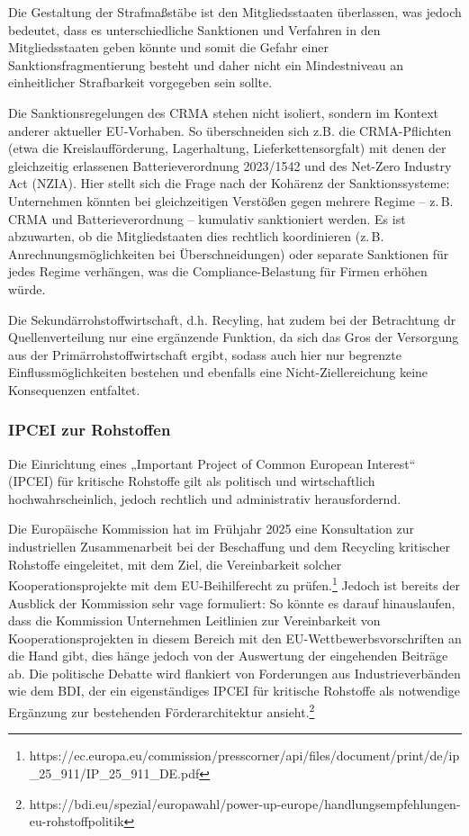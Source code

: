 \documentclass[12pt,a4paper,oneside]{book} %
\begin{document}
Die Gestaltung der Strafmaßstäbe ist den Mitgliedsstaaten überlassen, was jedoch bedeutet, dass es unterschiedliche Sanktionen und Verfahren in den Mitgliedsstaaten geben könnte und somit die Gefahr einer Sanktionsfragmentierung besteht und daher nicht ein Mindestniveau an einheitlicher Strafbarkeit vorgegeben sein sollte. 

Die Sanktionsregelungen des CRMA stehen nicht isoliert, sondern im Kontext anderer aktueller EU-Vorhaben. So überschneiden sich z.B. die CRMA-Pflichten (etwa die Kreislaufförderung, Lagerhaltung, Lieferkettensorgfalt) mit denen der gleichzeitig erlassenen Batterieverordnung 2023/1542 und des Net-Zero Industry Act (NZIA). Hier stellt sich die Frage nach der Kohärenz der Sanktionssysteme: Unternehmen könnten bei gleichzeitigen Verstößen gegen mehrere Regime – z. B. CRMA und Batterieverordnung – kumulativ sanktioniert werden. Es ist abzuwarten, ob die Mitgliedstaaten dies rechtlich koordinieren (z. B. Anrechnungsmöglichkeiten bei Überschneidungen) oder separate Sanktionen für jedes Regime verhängen, was die Compliance-Belastung für Firmen erhöhen würde.

Die Sekundärrohstoffwirtschaft, d.h. Recyling, hat zudem bei der Betrachtung dr Quellenverteilung nur eine ergänzende Funktion, da sich das Gros der Versorgung aus der Primärrohstoffwirtschaft ergibt,\autocite{Frenz 2025, S. 1066} sodass auch hier nur begrenzte Einflussmöglichkeiten bestehen und ebenfalls eine Nicht-Ziellereichung keine Konsequenzen entfaltet.



\subsubsection{IPCEI zur Rohstoffen}
Die Einrichtung eines „Important Project of Common European Interest“ (IPCEI) für kritische Rohstoffe gilt als politisch und wirtschaftlich hochwahrscheinlich, jedoch rechtlich und administrativ herausfordernd.

Die Europäische Kommission hat im Frühjahr 2025 eine Konsultation zur industriellen Zusammenarbeit bei der Beschaffung und dem Recycling kritischer Rohstoffe eingeleitet, mit dem Ziel, die Vereinbarkeit solcher Kooperationsprojekte mit dem EU-Beihilferecht zu prüfen.\footnote{https://ec.europa.eu/commission/presscorner/api/files/document/print/de/ip_25_911/IP_25_911_DE.pdf} Jedoch ist bereits der Ausblick der Kommission sehr vage formuliert: So \glqq könnte es darauf hinauslaufen, dass die Kommission Unternehmen Leitlinien zur Vereinbarkeit von
Kooperationsprojekten in diesem Bereich mit den EU-Wettbewerbsvorschriften an die Hand gibt\grqq, dies hänge jedoch \glqq von der Auswertung der eingehenden Beiträge ab\grqq. Die politische Debatte wird flankiert von Forderungen aus Industrieverbänden wie dem BDI, der ein eigenständiges IPCEI für kritische Rohstoffe als notwendige Ergänzung zur bestehenden Förderarchitektur ansieht.\footnote{https://bdi.eu/spezial/europawahl/power-up-europe/handlungsempfehlungen-eu-rohstoffpolitik}
\end{document}
